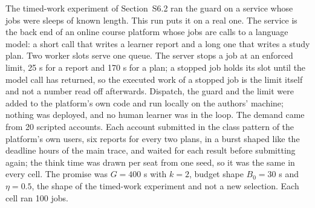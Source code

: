 \documentclass[mathematics,supfile,submit,moreauthors]{Definitions/mdpi}
\newcommand{\devnum}[1]{#1}
\begin{document}
The timed-work experiment of Section~S6.2 ran the guard on a service whose jobs were
sleeps of known length. This run puts it on a real one. The service is the back end of
an online course platform whose jobs are calls to a language model: a short call that
writes a learner report and a long one that writes a study plan. Two worker slots serve
one queue. The server stops a job at an enforced limit, \devnum{25} s for a report and
\devnum{170} s for a plan; a stopped job holds its slot until the model call has
returned, so the executed work of a stopped job is the limit itself and not a
number read off afterwards. Dispatch, the guard and the limit were added to the
platform's own code and run locally on the authors' machine; nothing was deployed,
and no human learner was in the loop. The demand came from \devnum{20} scripted
accounts. Each account submitted in the class pattern of the platform's own users,
six reports for every two plans, in a burst shaped like the deadline hours of the
main trace, and waited for each result before submitting again; the think time was
drawn per seat from one seed, so it was the same in every cell. The promise was
$G=\devnum{400}$ s with $k=\devnum{2}$, budget shape $B_0=\devnum{30}$ s and
$\eta=\devnum{0.5}$, the shape of the timed-work experiment and not a new selection.
Each cell ran \devnum{100} jobs.
\end{document}
